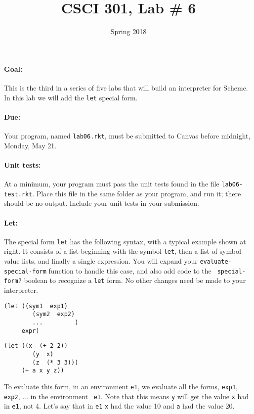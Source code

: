 \documentclass{article}
\title{CSCI 301, Lab \# 6}
\author{Spring 2018}
\date{}
\begin{document}
\maketitle


\paragraph{Goal:} This is the third in a series of five labs that will
build an interpreter for Scheme.  In this lab we will add the {\tt let}
special form.

\paragraph{Due:} Your program, named {\tt lab06.rkt}, must be submitted to
Canvas before midnight, Monday, May 21.

\paragraph{Unit tests:}
At a minimum, your program must pass the unit tests found in the
file {\tt lab06-test.rkt}.  Place this file in the same folder
as your program, and run it;  there should be no output.  Include
your unit tests in your submission.

\paragraph{Let:}

The special form {\tt let} has the following syntax, with a typical
example shown at right.  It consists of a list beginning with the
symbol {\tt let}, then a list of symbol-value lists, and finally a
single expression.  You will expand your {\tt evaluate-special-form}
function to handle this case, and also add code to the {\tt
  special-form?} boolean to recognize a {\tt let} form.  No other
changes need be made to your interpreter.
\begin{multicols}{2}
\begin{Verbatim}[frame=single]
  (let ((sym1  exp1)
        (sym2  exp2)
        ...         )
     expr)
\end{Verbatim}
\begin{Verbatim}[frame=single]
  (let ((x  (+ 2 2))
        (y  x)
        (z  (* 3 3)))
     (+ a x y z))
\end{Verbatim}
\end{multicols}
To evaluate this form, in an environment {\tt e1}, we evaluate
all the forms, {\tt exp1}, {\tt exp2}, ... in the environment {\tt
  e1}.   Note that this means {\tt y} will get the value {\tt x} had
in {\tt e1}, not 4.  Let's say that in {\tt e1} {\tt x} had the value
10 and {\tt a} had the value 20.
\end{document}
